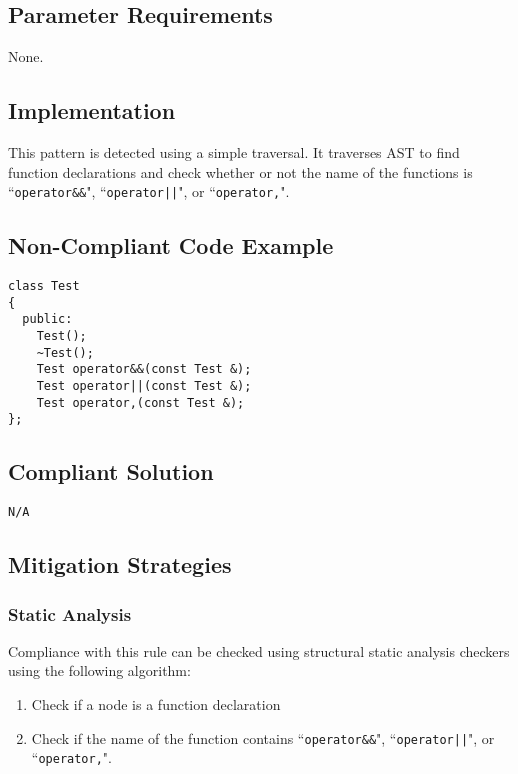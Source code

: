 \subsection{Parameter Requirements}

None.

\subsection{Implementation}

   This pattern is detected using a simple traversal. It traverses AST to find function declarations and check whether or not the name of the functions is ``\texttt{operator\&\&}", ``\texttt{operator||}", or ``\texttt{operator,}".

\subsection{Non-Compliant Code Example}


\begin{verbatim}
class Test
{
  public:
    Test();
    ~Test();
    Test operator&&(const Test &);
    Test operator||(const Test &);
    Test operator,(const Test &);
};
\end{verbatim}

\subsection{Compliant Solution}


\begin{verbatim}
N/A
\end{verbatim}

\subsection{Mitigation Strategies}
\subsubsection{Static Analysis} 

Compliance with this rule can be checked using structural static analysis checkers using the following algorithm:

\begin{enumerate}
\item Check if a node is a function declaration
\item Check if the name of the function contains ``\texttt{operator\&\&}", ``\texttt{operator||}", or ``\texttt{operator,}".
\end{enumerate}

